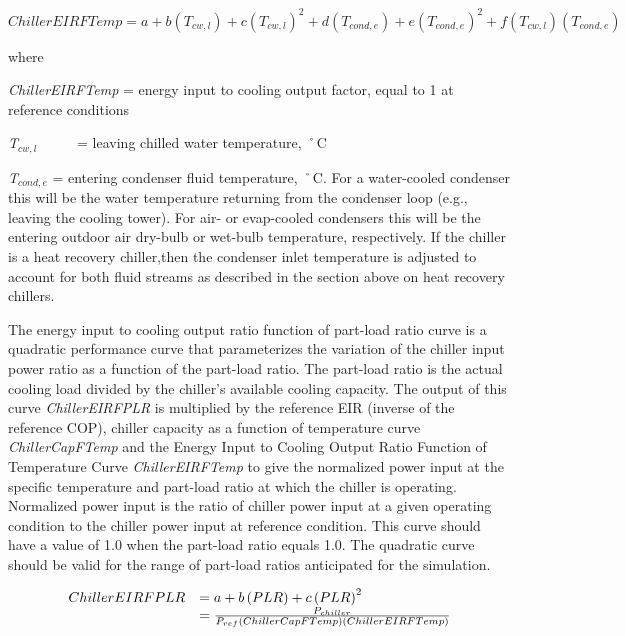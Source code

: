 \begin{equation}
ChillerEIRFTemp = a + b\left( {{T_{cw,l}}} \right) + c{\left( {{T_{cw,l}}} \right)^2} + d\left( {{T_{cond,e}}} \right) + e{\left( {{T_{cond,e}}} \right)^2} + f\left( {{T_{cw,l}}} \right)\left( {{T_{cond,e}}} \right)
\end{equation}

where

\emph{ChillerEIRFTemp} = energy input to cooling output factor, equal to 1 at reference conditions

\emph{T\(_{cw,l}\)}~~~~~ = leaving chilled water temperature, ˚C

\emph{T\(_{cond,e}\)} = entering condenser fluid temperature, ˚C. For a water-cooled condenser this will be the water temperature returning from the condenser loop (e.g., leaving the cooling tower). For air- or evap-cooled condensers this will be the entering outdoor air dry-bulb or wet-bulb temperature, respectively. If the chiller is a heat recovery chiller,then the condenser inlet temperature is adjusted to account for both fluid streams as described in the section above on heat recovery chillers.

The energy input to cooling output ratio function of part-load ratio curve is a quadratic performance curve that parameterizes the variation of the chiller input power ratio as a function of the part-load ratio. The part-load ratio is the actual cooling load divided by the chiller's available cooling capacity. The output of this curve \textit{ChillerEIRFPLR} is multiplied by the reference EIR (inverse of the reference COP), chiller capacity as a function of temperature curve \textit{ChillerCapFTemp} and the Energy Input to Cooling Output Ratio Function of Temperature Curve \textit{ChillerEIRFTemp} to give the normalized power input at the specific temperature and part-load ratio at which the chiller is operating. Normalized power input is the ratio of chiller power input at a given operating condition to the chiller power input at reference condition. This curve should have a value of 1.0 when the part-load ratio equals 1.0. The quadratic curve should be valid for the range of part-load ratios anticipated for the simulation.

\begin{equation}
  \begin{array}{rl}
    ChillerEIRFPLR &= a + b\left(PLR\right) + c\left(PLR\right)^2\\
                   &= \frac{P_{chiller}}{{P_{ref}}\left( {ChillerCapFTemp} \right)\left( {ChillerEIRFTemp} \right)}
  \end{array}
\end{equation}

